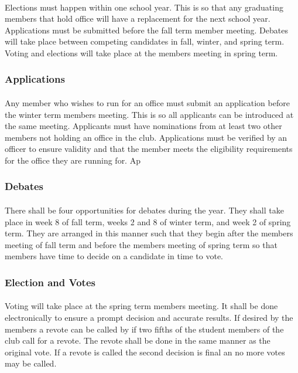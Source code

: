 \documentclass[12pt]{article}
\begin{document}
\paragraph{}
Elections must happen within one school year. This is so that any graduating members that hold office will have a replacement for the next school year. Applications must be submitted before the fall term member meeting. Debates will take place between competing candidates in fall, winter, and spring term. Voting and elections will take place at the members meeting in spring term.

\subsubsection{Applications}
\paragraph{}
Any member who wishes to run for an office must submit an application before the winter term members meeting. This is so all applicants can be introduced at the same meeting. Applicants must have nominations from at least two other members not holding an office in the club. Applications must be verified by an officer to ensure validity and that the member meets the eligibility requirements for the office they are running for. Ap

\subsubsection{Debates}
\paragraph{}
There shall be four opportunities for debates during the year. They shall take place in week 8 of fall term, weeks 2 and 8 of winter term, and week 2 of spring term. They are arranged in this manner such that they begin after the members meeting of fall term and before the members meeting of spring term so that members have time to decide on a candidate in time to vote.

\subsubsection{Election and Votes}
\paragraph{}
Voting will take place at the spring term members meeting. It shall be done electronically to ensure a prompt decision and accurate results. If desired by the members a revote can be called by if two fifths of the student members of the club call for a revote. The revote shall be done in the same manner as the original vote. If a revote is called the second decision is final an no more votes may be called. 
\end{document}
